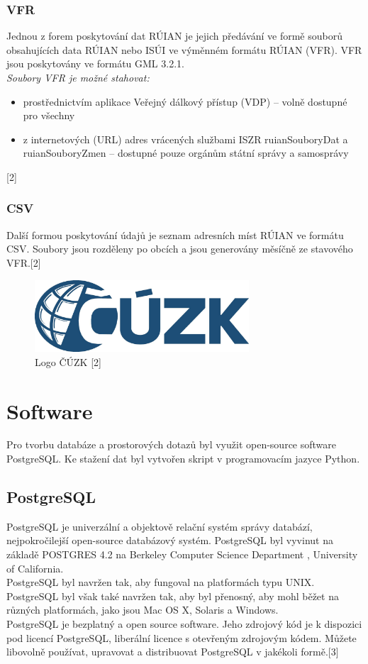 \documentclass[a4paper, 12pt]{article}
\begin{document}
\subsubsection{VFR}
Jednou z forem poskytování dat RÚIAN je jejich předávání ve formě souborů obsahujících data RÚIAN nebo ISÚI ve výměnném formátu RÚIAN (VFR). VFR jsou poskytovány ve formátu GML 3.2.1.\\
\textit{Soubory VFR je možné stahovat:}
\begin{itemize}
\item prostřednictvím aplikace Veřejný dálkový přístup (VDP) – volně dostupné pro všechny
\item z internetových (URL) adres vrácených službami ISZR ruianSouboryDat a ruianSouboryZmen – dostupné pouze orgánům státní správy a samosprávy
\end{itemize}[2]

\subsubsection{CSV}
Další formou poskytování údajů je seznam adresních míst RÚIAN ve formátu CSV. Soubory jsou rozděleny po obcích a jsou generovány měsíčně ze stavového VFR.[2]

\begin{figure}[h!]
	\centering
	\includegraphics[width=8cm]{cuzk.jpg}
	\caption{Logo ČÚZK [2]}
\end{figure}

\section{Software}
Pro tvorbu databáze a prostorových dotazů byl využit open-source software PostgreSQL. Ke stažení dat byl vytvořen skript v programovacím jazyce Python.

\subsection{PostgreSQL}
PostgreSQL je univerzální a objektově relační systém správy databází, nejpokročilejší open-source databázový systém. PostgreSQL byl vyvinut na základě POSTGRES 4.2 na Berkeley Computer Science Department , University of California.\\
PostgreSQL byl navržen tak, aby fungoval na platformách typu UNIX. PostgreSQL byl však také navržen tak, aby byl přenosný, aby mohl běžet na různých platformách, jako jsou Mac OS X, Solaris a Windows.\\
PostgreSQL je bezplatný a open source software. Jeho zdrojový kód je k dispozici pod licencí PostgreSQL, liberální licence s otevřeným zdrojovým kódem. Můžete libovolně používat, upravovat a distribuovat PostgreSQL v jakékoli formě.[3]\\
\end{document}
